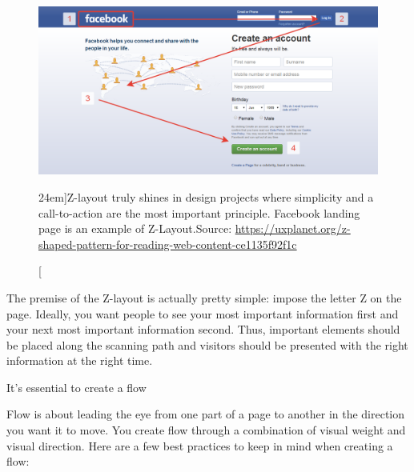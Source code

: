 \begin{figure}%
	\centering
  \includegraphics[width=1.55\textwidth]{../figures/z-shape_facebook.png}
  \caption[][24em]{Z-layout truly shines in design projects where simplicity and a call-to-action are the most important principle. Facebook landing page is an example of Z-Layout.\newline Source: \url{https://uxplanet.org/z-shaped-pattern-for-reading-web-content-ce1135f92f1c}}
  \label{fig:z-shape_facebook}
\end{figure}

The premise of the Z-layout is actually pretty simple: impose the letter Z on the page. Ideally, you want people to see your most important information first and your next most important information second. Thus, important elements should be placed along the scanning path and visitors should be presented with the right information at the right time.

It’s essential to create a flow

Flow is about leading the eye from one part of a page to another in the direction you want it to move. You create flow through a combination of visual weight and visual direction. Here are a few best practices to keep in mind when creating a flow:

